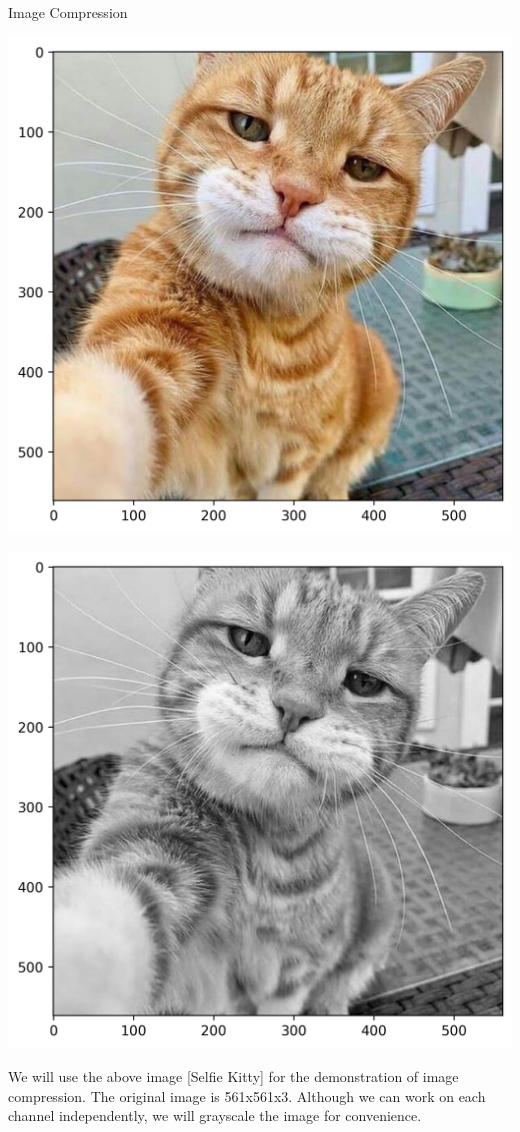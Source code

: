 \documentclass{beamer}
\begin{document}
\begin{frame}{Image Compression}
    \begin{minipage}{0.40\textwidth}
        \centering
        \includegraphics[width=\linewidth]{images/pca/origCat.png}
    \end{minipage}
    \hfill
    \begin{minipage}{0.40\textwidth}
        \centering
        \includegraphics[width=\linewidth]{images/pca/origCat_gray.png}
    \end{minipage}

    We will use the above image [Selfie Kitty] for the demonstration of image compression. The original image is 561x561x3. Although we can work on each channel independently, we will grayscale the image for convenience.
\end{frame}
\end{document}
